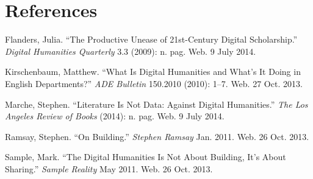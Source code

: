 \documentclass[]{article}
\begin{document}
\section{}\label{section}

\section*{References}\label{references}

Flanders, Julia. ``The Productive Unease of 21st-Century Digital
Scholarship.'' \emph{Digital Humanities Quarterly} 3.3 (2009): n. pag.
Web. 9 July 2014.

Kirschenbaum, Matthew. ``What Is Digital Humanities and What's It Doing
in English Departments?'' \emph{ADE Bulletin} 150.2010 (2010): 1--7.
Web. 27 Oct. 2013.

Marche, Stephen. ``Literature Is Not Data: Against Digital Humanities.''
\emph{The Los Angeles Review of Books} (2014): n. pag. Web. 9 July 2014.

Ramsay, Stephen. ``On Building.'' \emph{Stephen Ramsay} Jan. 2011. Web.
26 Oct. 2013.

Sample, Mark. ``The Digital Humanities Is Not About Building, It's About
Sharing.'' \emph{Sample Reality} May 2011. Web. 26 Oct. 2013.
\end{document}
